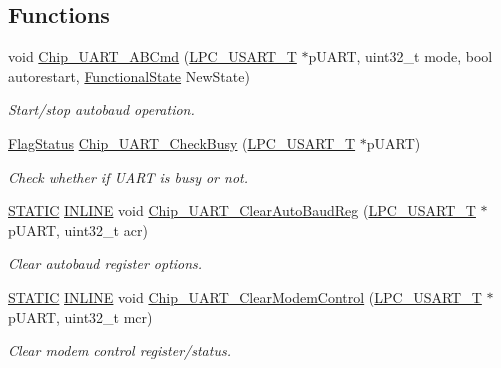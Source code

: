 \subsection*{Functions}
\begin{DoxyCompactItemize}
\item 
void \hyperlink{group__UART__17XX__40XX_ga9aa733f176891043bb1dd4d87940187f}{Chip\+\_\+\+U\+A\+R\+T\+\_\+\+A\+B\+Cmd} (\hyperlink{structLPC__USART__T}{L\+P\+C\+\_\+\+U\+S\+A\+R\+T\+\_\+T} $\ast$p\+U\+A\+RT, uint32\+\_\+t mode, bool autorestart, \hyperlink{group__LPC__Types__Public__Types_gac9a7e9a35d2513ec15c3b537aaa4fba1}{Functional\+State} New\+State)
\begin{DoxyCompactList}\small\item\em Start/stop autobaud operation. \end{DoxyCompactList}\item 
\hyperlink{group__LPC__Types__Public__Types_ga89136caac2e14c55151f527ac02daaff}{Flag\+Status} \hyperlink{group__UART__17XX__40XX_ga1b5b93f60a5b0a28e5af5f3f3311bcba}{Chip\+\_\+\+U\+A\+R\+T\+\_\+\+Check\+Busy} (\hyperlink{structLPC__USART__T}{L\+P\+C\+\_\+\+U\+S\+A\+R\+T\+\_\+T} $\ast$p\+U\+A\+RT)
\begin{DoxyCompactList}\small\item\em Check whether if U\+A\+RT is busy or not. \end{DoxyCompactList}\item 
\hyperlink{group__LPC__Types__Public__Macros_ga10b2d890d871e1489bb02b7e70d9bdfb}{S\+T\+A\+T\+IC} \hyperlink{group__LPC__Types__Public__Types_ga2eb6f9e0395b47b8d5e3eeae4fe0c116}{I\+N\+L\+I\+NE} void \hyperlink{group__UART__17XX__40XX_ga6a6d30f304047175780d16207bab2b09}{Chip\+\_\+\+U\+A\+R\+T\+\_\+\+Clear\+Auto\+Baud\+Reg} (\hyperlink{structLPC__USART__T}{L\+P\+C\+\_\+\+U\+S\+A\+R\+T\+\_\+T} $\ast$p\+U\+A\+RT, uint32\+\_\+t acr)
\begin{DoxyCompactList}\small\item\em Clear autobaud register options. \end{DoxyCompactList}\item 
\hyperlink{group__LPC__Types__Public__Macros_ga10b2d890d871e1489bb02b7e70d9bdfb}{S\+T\+A\+T\+IC} \hyperlink{group__LPC__Types__Public__Types_ga2eb6f9e0395b47b8d5e3eeae4fe0c116}{I\+N\+L\+I\+NE} void \hyperlink{group__UART__17XX__40XX_gabdcefa8f847cfa0de2f9292405827874}{Chip\+\_\+\+U\+A\+R\+T\+\_\+\+Clear\+Modem\+Control} (\hyperlink{structLPC__USART__T}{L\+P\+C\+\_\+\+U\+S\+A\+R\+T\+\_\+T} $\ast$p\+U\+A\+RT, uint32\+\_\+t mcr)
\begin{DoxyCompactList}\small\item\em Clear modem control register/status. \end{DoxyCompactList}\item 

\end{DoxyCompactItemize}
